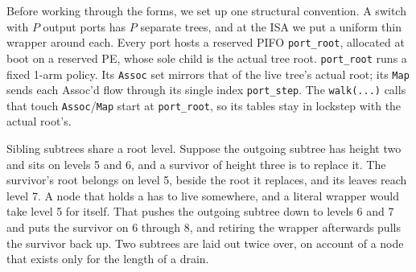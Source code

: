 Before working through the forms, we set up one structural convention.
A switch with \(P\) output ports has \(P\) separate trees, and at the ISA we put a uniform thin wrapper around each.
Every port hosts a reserved PIFO \texttt{port\_root}, allocated at boot on a reserved PE, whose sole child is the actual tree root.
\texttt{port\_root} runs a fixed 1-arm policy.
Its \texttt{Assoc} set mirrors that of the live tree's actual root; its \texttt{Map} sends each Assoc'd flow through its single index \texttt{port\_step}.
The \texttt{walk(...)} calls that touch \texttt{Assoc}/\texttt{Map} start at \texttt{port\_root}, so its tables stay in lockstep with the actual root's.

Sibling subtrees share a root level.
Suppose the outgoing subtree has height two and sits on levels 5 and 6, and a survivor of height three is to replace it.
The survivor's root belongs on level 5, beside the root it replaces, and its leaves reach level 7.
A node that holds a \pifo has to live somewhere, and a literal  wrapper would take level 5 for itself.
That pushes the outgoing subtree down to levels 6 and 7 and puts the survivor on 6 through 8, and retiring the wrapper afterwards pulls the survivor back up.
Two subtrees are laid out twice over, on account of a node that exists only for the length of a drain.


